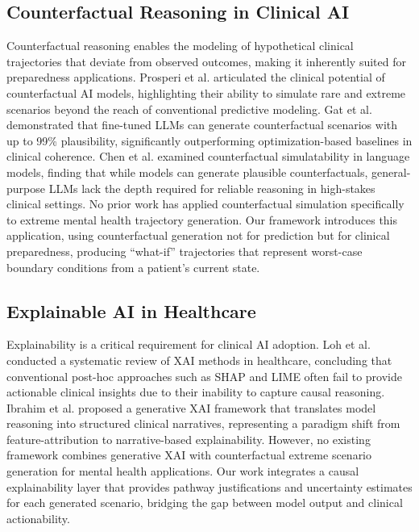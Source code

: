 \documentclass[conference]{IEEEtran}
\begin{document}
\subsection{Counterfactual Reasoning in Clinical AI}

Counterfactual reasoning enables the modeling of hypothetical clinical trajectories that deviate from observed outcomes, making it inherently suited for preparedness applications. Prosperi et al. \cite{b8} articulated the clinical potential of counterfactual AI models, highlighting their ability to simulate rare and extreme scenarios beyond the reach of conventional predictive modeling. Gat et al. \cite{b9} demonstrated that fine-tuned LLMs can generate counterfactual scenarios with up to 99\% plausibility, significantly outperforming optimization-based baselines in clinical coherence. Chen et al. \cite{b18} examined counterfactual simulatability in language models, finding that while models can generate plausible counterfactuals, general-purpose LLMs lack the depth required for reliable reasoning in high-stakes clinical settings. No prior work has applied counterfactual simulation specifically to extreme mental health trajectory generation. Our framework introduces this application, using counterfactual generation not for prediction but for clinical preparedness, producing ``what-if'' trajectories that represent worst-case boundary conditions from a patient's current state.

\subsection{Explainable AI in Healthcare}

Explainability is a critical requirement for clinical AI adoption. Loh et al. \cite{b10} conducted a systematic review of XAI methods in healthcare, concluding that conventional post-hoc approaches such as SHAP and LIME often fail to provide actionable clinical insights due to their inability to capture causal reasoning. Ibrahim et al. \cite{b11} proposed a generative XAI framework that translates model reasoning into structured clinical narratives, representing a paradigm shift from feature-attribution to narrative-based explainability. However, no existing framework combines generative XAI with counterfactual extreme scenario generation for mental health applications. Our work integrates a causal explainability layer that provides pathway justifications and uncertainty estimates for each generated scenario, bridging the gap between model output and clinical actionability.
\end{document}
